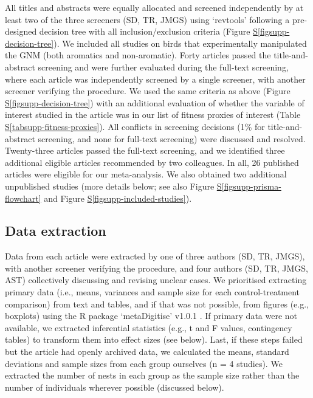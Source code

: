 \documentclass[
  number,
  review,
  onecolumn]{elsarticle}
\newcommand*\quartofigsuppref[1]{Figure \hyperref[#1]{S\ref{#1}}}
\newcommand*\quartotabsuppref[1]{Table \hyperref[#1]{S\ref{#1}}}
\begin{document}
All titles and abstracts were equally allocated and screened
independently by at least two of the three screeners (SD, TR, JMGS)
using `revtools' following a pre-designed decision tree with all
inclusion/exclusion criteria (\quartofigsuppref{figsupp-decision-tree}).
We included all studies on birds that experimentally manipulated the GNM
(both aromatics and non-aromatic). Forty articles passed the
title-and-abstract screening and were further evaluated during the
full-text screening, where each article was independently screened by a
single screener, with another screener verifying the procedure. We used
the same criteria as above (\quartofigsuppref{figsupp-decision-tree})
with an additional evaluation of whether the variable of interest
studied in the article was in our list of fitness proxies of interest
(\quartotabsuppref{tabsupp-fitness-proxies}). All conflicts in screening
decisions (1\% for title-and-abstract screening, and none for full-text
screening) were discussed and resolved. Twenty-three articles passed the
full-text screening, and we identified three additional eligible
articles recommended by two colleagues. In all, 26 published articles
were eligible for our meta-analysis. We also obtained two additional
unpublished studies (more details below; see also
\quartofigsuppref{figsupp-prisma-flowchart} and
\quartofigsuppref{figsupp-included-studies}).

\subsection{Data extraction}\label{data-extraction}

Data from each article were extracted by one of three authors (SD, TR,
JMGS), with another screener verifying the procedure, and four authors
(SD, TR, JMGS, AST) collectively discussing and revising unclear cases.
We prioritised extracting primary data (i.e., means, variances and
sample size for each control-treatment comparison) from text and tables,
and if that was not possible, from figures (e.g., boxplots) using the R
package `metaDigitise' v1.0.1 \citep{pick2018}. If primary data were not
available, we extracted inferential statistics (e.g., t and F values,
contingency tables) to transform them into effect sizes (see below).
Last, if these steps failed but the article had openly archived data, we
calculated the means, standard deviations and sample sizes from each
group ourselves (n = 4 studies). We extracted the number of nests in
each group as the sample size rather than the number of individuals
wherever possible (discussed below).
\end{document}
